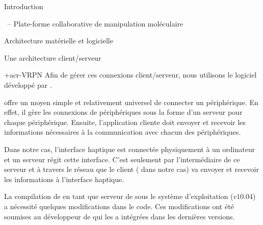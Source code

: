 \documentclass[myfrancais]{mythesis}
\begin{document}
\begin{mypart}{Introduction}
\begin{mychapter}{\myShaddock\ -- Plate-forme collaborative de manipulation moléculaire}
\begin{mysection}{Architecture matérielle et logicielle}
\begin{mysubsection}{Une architecture client/serveur}
					\begin{mysubsubsection}{\myacronl+{acr-VRPN}}
						Afin de gérer ces connexions client/serveur, nous utilisons le logiciel  développé par .

						 offre un moyen simple et relativement universel de connecter un périphérique.
						En effet, il gère les connexions de périphériques sous la forme d'un serveur pour chaque périphérique.
						Ensuite, l'application cliente doit envoyer et recevoir les informations nécessaires à la communication avec chacun des périphériques.

						Dans notre cas, l'interface haptique est connectée physiquement à un ordinateur et un serveur  régit cette interface.
						C'est seulement par l'intermédiaire de ce serveur  et à travers le réseau que le client ( dans notre cas) va envoyer et recevoir les informations à l'interface haptique.

						La compilation de  en tant que serveur de \myOmni sous le système d'exploitation \myLinux (\myUbuntu $v10.04$) a nécessité quelques modifications dans le code.
						Ces modifications ont été soumises au développeur de  qui les a intégrées dans les dernières versions.


\end{mysubsubsection}
\end{mysubsection}
\end{mysection}
\end{mychapter}
\end{mypart}
\end{document}
